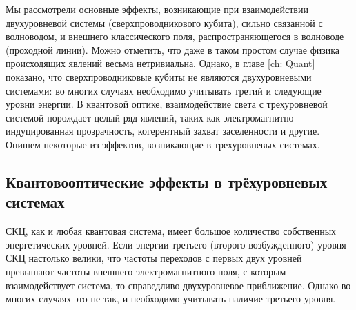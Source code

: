 
Мы рассмотрели основные эффекты, возникающие при взаимодействии двухуровневой системы (сверхпроводникового кубита), сильно связанной с волноводом, и внешнего классического поля, распространяющегося в волноводе (проходной линии). Можно отметить, что даже в таком простом случае физика происходящих явлений весьма нетривиальна. Однако, в главе \ref{ch: Quant} показано, что сверхпроводниковые кубиты не являются двухуровневыми системами: во многих случаях необходимо учитывать третий и следующие уровни энергии. В квантовой оптике, взаимодействие света с трехуровневой системой порождает целый ряд явлений, таких как электромагнитно-индуцированная прозрачность, когерентный захват заселенности и другие. Опишем некоторые из эффектов, возникающие в трехуровневых системах.

\subsection{Квантовооптические эффекты в трёхуровневых системах}
\label{sec: qo3ls}
СКЦ, как и любая квантовая система, имеет большое количество собственных энергетических уровней. Если энергии третьего (второго возбужденного) уровня СКЦ настолько велики, что частоты переходов с первых двух уровней превышают частоты внешнего электромагнитного поля, с которым взаимодействует система, то справедливо двухуровневое приближение. Однако во многих случаях это не так, и необходимо учитывать наличие третьего уровня. 

